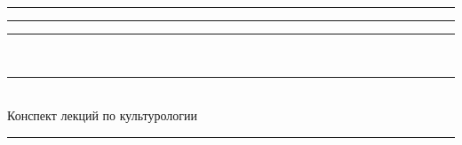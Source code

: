 \documentclass[12pt,chapters,notitlepage,pscyr]{hedwork}
\begin{document}
  \begin{titlepage}
    \vspace*{\fill}
    \center
    \Large
    \rule[.5ex]{6em}{.5pt} \decothreeleft \rule{1em}{0pt}
    \decosix \rule{1em}{0pt}
    \decothreeright\ \rule[.5ex]{6em}{.5pt} \\[2ex]
    
    Конспект лекций по культурологии \\[1.5ex]
    
    \rule{18.2em}{.5pt}
    \vspace*{\fill}
  \end{titlepage}
  
   \newpage
  
\end{document}
